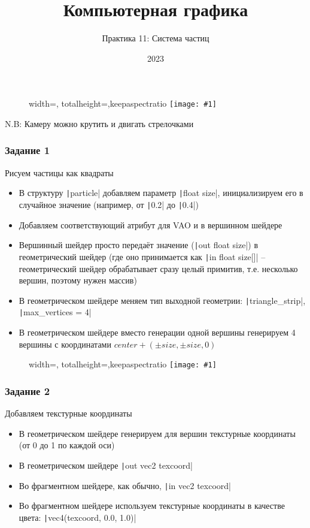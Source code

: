 \documentclass[10pt]{beamer}
\title{Компьютерная графика}
\subtitle{Практика 11: Система частиц}
\date{2023}
\newcommand{\slideimage}[1]{
  \begin{figure}
    \begin{adjustbox}{width=\textwidth, totalheight=\textheight-2\baselineskip-2\baselineskip,keepaspectratio}
      \texttt{[image: \#1]}
    \end{adjustbox}
  \end{figure}
}
\begin{document}
\frame{\titlepage}

\begin{frame}[fragile]
\slideimage{0.png}
\end{frame}

\begin{frame}[fragile]
N.B: Камеру можно крутить и двигать стрелочками
\end{frame}

\begin{frame}[fragile]
\frametitle{Задание 1}
Рисуем частицы как квадраты
\begin{itemize}
\item В структуру \texttt|particle| добавляем параметр \texttt|float size|, инициализируем его в случайное значение (например, от \texttt|0.2| до \texttt|0.4|)
\item Добавляем соответствующий атрибут для VAO и в вершинном шейдере
\item Вершинный шейдер просто передаёт значение (\texttt|out float size|) в геометрический шейдер (где оно принимается как \texttt|in float size[]| -- геометрический шейдер обрабатывает сразу целый примитив, т.е. несколько вершин, поэтому нужен массив)
\item В геометрическом шейдере меняем тип выходной геометрии: \texttt|triangle_strip|, \texttt|max_vertices = 4|
\item В геометрическом шейдере вместо генерации одной вершины генерируем 4 вершины с координатами \begin{math}center + (\pm size, \pm size, 0)\end{math}
\end{itemize}
\end{frame}

\begin{frame}[fragile]
\slideimage{1.png}
\end{frame}

\begin{frame}[fragile]
\frametitle{Задание 2}
Добавляем текстурные координаты
\begin{itemize}
\item В геометрическом шейдере генерируем для вершин текстурные координаты (от 0 до 1 по каждой оси)
\item В геометрическом шейдере \texttt|out vec2 texcoord|
\item Во фрагментном шейдере, как обычно, \texttt|in vec2 texcoord|
\item Во фрагментном шейдере используем текстурные координаты в качестве цвета: \texttt|vec4(texcoord, 0.0, 1.0)|
\end{itemize}
\end{frame}
\end{document}
